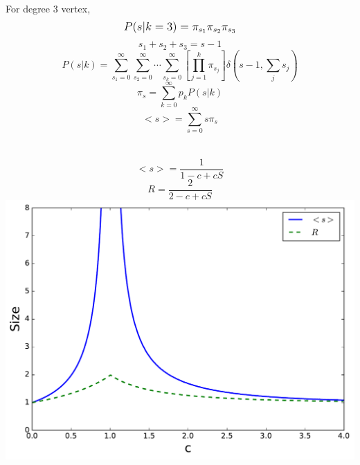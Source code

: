 \documentclass{beamer}
\begin{document}
\begin{frame}
    \frametitle{}
For degree $3$ vertex, 
    $$\mathlarger{P(s|k=3) = \pi_{s_1}\pi_{s_2}\pi_{s_3}}$$
    $$s_1 + s_2 + s_3 = s-1$$
\pause
\justifying
$$P(s|k) = \sum\limits_{s_1=0}^{\infty}\sum\limits_{s_2=0}^{\infty}\cdots\sum\limits_{s_k=0}^{\infty}\left[\prod\limits_{j=1}^k\pi_{s_j}\right]\delta(s-1, \sum\limits_js_j)$$
\pause
$$\pi_s = \sum\limits_{k=0}^{\infty}p_kP(s|k)$$
$$<s> = \sum\limits_{s=0}^\infty s\pi_s$$
\end{frame}
\begin{frame}
    \frametitle{}
    \begin{columns}
    $$<s> = \frac{1}{1-c+cS}$$
        \vspace{2em}
        \pause
    $$R = \frac{2}{2-c+cS}$$
    \centering
        \pause
        \includegraphics[width=\columnwidth]{average_small_comp.pdf}
    \end{columns}
\end{frame}
\end{document}
